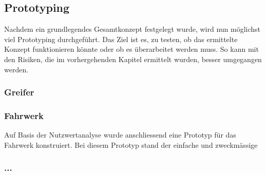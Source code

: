 \subsection{Prototyping}

Nachdem ein grundlegendes Gesamtkonzept festgelegt wurde, wird nun möglichst viel Prototyping durchgeführt. Das Ziel ist es, zu testen, ob das ermittelte Konzept funktionieren könnte oder ob es überarbeitet werden muss. So kann mit den Risiken, die im vorhergehenden Kapitel ermittelt wurden, besser umgegangen werden.

\subsubsection{Greifer}

\subsubsection{Fahrwerk}

Auf Basis der Nutzwertanalyse wurde anschliessend eine Prototyp für das Fahrwerk konstruiert. Bei diesem Prototyp stand der einfache und zweckmässige 

\subsubsection{...}

